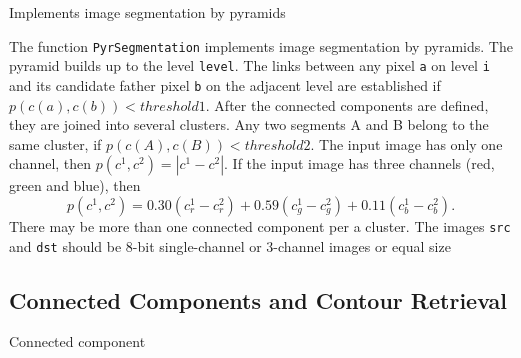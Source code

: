 \label{PyrSegmentation}

Implements image segmentation by pyramids


\begin{description}
\end{description}

The function \texttt{PyrSegmentation} implements image segmentation by pyramids. The pyramid builds up to the level \texttt{level}. The links between any pixel \texttt{a} on level \texttt{i} and its candidate father pixel \texttt{b} on the adjacent level are established if
$p(c(a),c(b))<threshold1$.
After the connected components are defined, they are joined into several clusters.
Any two segments A and B belong to the same cluster, if $p(c(A),c(B))<threshold2$.
The input image has only one channel, then $p(c^1,c^2)=|c^1-c^2|$.
If the input image has three channels (red, green and blue), then
\[
  p(c^1,c^2) = 0.30 (c^1_r - c^2_r) +
               0.59 (c^1_g - c^2_g) +
               0.11 (c^1_b - c^2_b). \]
There may be more than one connected component per a cluster. The images \texttt{src} and \texttt{dst} should be 8-bit single-channel or 3-channel images or equal size

\subsection{Connected Components and Contour Retrieval}

\label{CvConnectedComp}

Connected component


